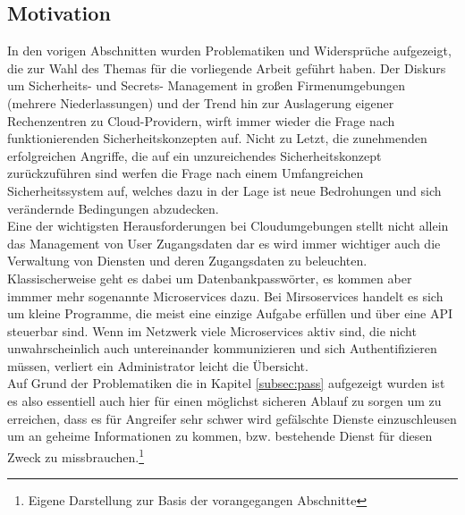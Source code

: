 \documentclass[
book,
a4paper,   
titlepage,  
halfparskip,
12pt        
]{scrartcl}
\begin{document}
\begin{onehalfspacing}
\subsection{Motivation}
In den vorigen Abschnitten wurden Problematiken und Widersprüche aufgezeigt, die zur Wahl des Themas für die vorliegende Arbeit geführt haben. Der Diskurs um Sicherheits- und Secrets- Management in großen Firmenumgebungen (mehrere Niederlassungen) und der Trend hin zur Auslagerung eigener Rechenzentren zu Cloud-Providern, wirft immer wieder die Frage nach funktionierenden Sicherheitskonzepten auf. Nicht zu Letzt, die zunehmenden erfolgreichen Angriffe, die auf ein unzureichendes Sicherheitskonzept zurückzuführen sind werfen die Frage nach einem Umfangreichen Sicherheitssystem auf, welches dazu in der Lage ist neue Bedrohungen und sich verändernde Bedingungen abzudecken.\\
Eine der wichtigsten Herausforderungen bei Cloudumgebungen stellt nicht allein das Management von User Zugangsdaten dar es wird immer wichtiger auch die Verwaltung von Diensten und deren Zugangsdaten zu beleuchten. Klassischerweise geht es dabei um Datenbankpasswörter, es kommen aber immmer mehr sogenannte Microservices dazu. Bei Mirsoservices handelt es sich um kleine Programme, die meist eine einzige Aufgabe erfüllen und über eine \ac{API} steuerbar sind. Wenn im Netzwerk viele Microservices aktiv sind, die nicht unwahrscheinlich auch untereinander kommunizieren und sich Authentifizieren müssen, verliert ein Administrator leicht die Übersicht.\\
Auf Grund der Problematiken die in Kapitel \vref{subsec:pass} aufgezeigt wurden ist es also essentiell auch hier für einen möglichst sicheren Ablauf zu sorgen um zu erreichen, dass es für Angreifer sehr schwer wird gefälschte Dienste einzuschleusen um an geheime Informationen zu kommen, bzw. bestehende Dienst für diesen Zweck zu missbrauchen.\footnote{Eigene Darstellung zur Basis der vorangegangen Abschnitte}


\end{onehalfspacing}
\end{document}
